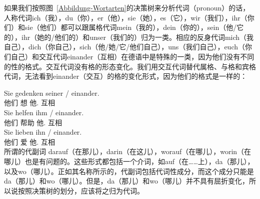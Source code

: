 如果我们按照图~\ref{Abbildung-Wortarten}的决策树来分析代词（pronoun）的话，人称代词ich（我），du（你），er（他），sie（她），es（它），wir（我们），ihr（你们）和sie（他们）都可以跟属格代词mein（我的），dein（你的），sein（他/它的），ihr（她的/他们的）和unser（我们的）归为一类。相应的反身代词mich（我自己），dich（你自己），sich（他/她/它/他们自己），uns（我们自己），euch（你们自己）和交互代词einander（互相）在德语中是特殊的一类，因为他们没有不同的性的格式。交互代词没有格的形态变化。我们用交互代词替代属格、与格和宾格代词，无法看到einander（交互）的格的变化形式，因为他们的格式是一样的：

\eal
\ex 
\gll Sie gedenken seiner / einander.\\
	 他们 想 他.\gen{} {} 互相\\
\ex 
\gll Sie helfen ihm / einander.\\
	 他们 帮助 他.\dat{} {} 互相\\
\ex 
\gll Sie lieben ihn / einander.\\
	 他们 爱 他.\acc{} {} 互相\\
\zl
%
所谓的代副词 darauf（在那儿），darin（在这儿），worauf（在哪儿），worin（在哪儿）也是有问题的。这些形式都包括一个介词，如auf（在……上），da（那儿），以及wo（哪儿）。正如其名称所示的，代副词包括代词性成分，而这个成分只能是da（那儿）和wo（哪儿）。但是，da（那儿）和wo（哪儿）并不具有屈折变化，所以说按照决策树的划分，应该将之归为代词。

